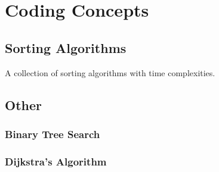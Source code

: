 \chapter{Coding Concepts}
\label{coding}

\section{Sorting Algorithms}
\label{coding:sorts}

\begin{table}[H]
\centering
\begingroup
\renewcommand*{\arraystretch}{1}

\endgroup
\caption{
A collection of sorting algorithms with time complexities.
}
\label{tab:sorting_table}
\end{table}

\section{Other}
\label{coding:other}

\subsection{Binary Tree Search}
\label{coding:other:binary_tree_search}

\subsection{Dijkstra's Algorithm}
\label{coding:other:dijkstra}
